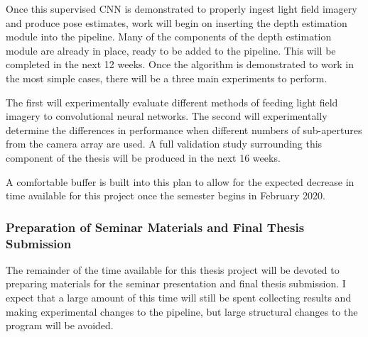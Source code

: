 \documentclass[openany]{book}
\begin{document}
Once this supervised CNN is demonstrated to properly ingest light field imagery and produce pose estimates, work will begin on inserting the depth estimation module into the pipeline. Many of the components of the depth estimation module are already in place, ready to be added to the pipeline. This will be completed in the next 12 weeks. Once the algorithm is demonstrated to work in the most simple cases, there will be a three main experiments to perform. 

The first will experimentally evaluate different methods of feeding light field imagery to convolutional neural networks. The second will experimentally determine the differences in performance when different numbers of sub-apertures from the camera array are used. A full validation study surrounding this component of the thesis will be produced in the next 16 weeks. 

A comfortable buffer is built into this plan to allow for the expected decrease in time available for this project once the semester begins in February 2020. 

\subsubsection{Preparation of Seminar Materials and Final Thesis Submission}
The remainder of the time available for this thesis project will be devoted to preparing materials for the seminar presentation and final thesis submission. I expect that a large amount of this time will still be spent collecting results and making experimental changes to the pipeline, but large structural changes to the program will be avoided. 

\newpage



\end{document}
